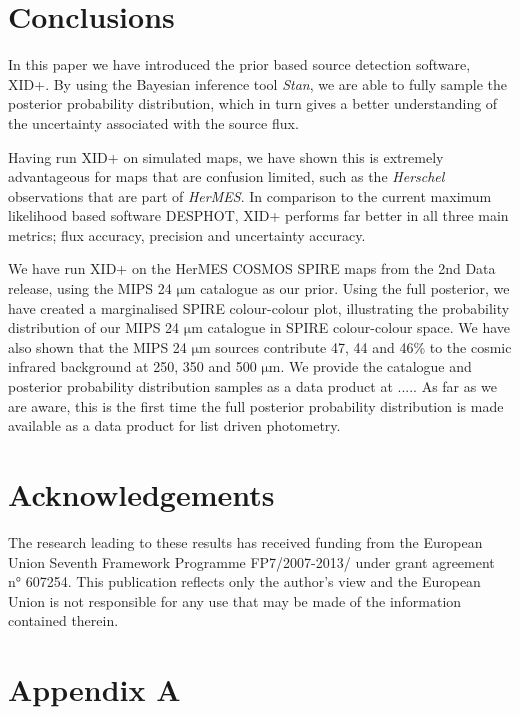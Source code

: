 \documentclass[useAMS,usenatbib]{mnras}
\begin{document}
\section{Conclusions}\label{sec:conc}
In this paper we have introduced the prior based source detection software, \textsc{XID+}. By using the Bayesian inference tool \emph{Stan}, we are able to fully sample the posterior probability distribution, which in turn gives a better understanding of the uncertainty associated with the source flux. 

Having run \textsc{XID+} on simulated maps, we have shown this is extremely advantageous for maps that are confusion limited, such as the \emph{Herschel} observations that are part of \emph{HerMES}. In comparison to the current maximum likelihood based software \textsc{DESPHOT}, XID+ performs far better in all three main metrics; flux accuracy, precision and uncertainty accuracy.

We have run \textsc{XID+} on the HerMES COSMOS SPIRE maps from the 2nd Data release, using the MIPS 24 $\mathrm{\mu m}$ catalogue \citep{LeFLoch:2009} as our prior. Using the full posterior, we have created a marginalised SPIRE colour-colour plot, illustrating the probability distribution of our MIPS 24 $\mathrm{\mu m}$ catalogue in SPIRE colour-colour space. We have also shown that the MIPS 24 $\mathrm{\mu m}$ sources contribute 47, 44 and 46\%  to the cosmic infrared background at 250, 350 and 500 $\mathrm{\mu m}$. We provide the catalogue and posterior probability distribution samples as a data product at ..... As far as we are aware, this is the first time the full posterior probability distribution is made available as a data product for list driven photometry.
 

\section*{Acknowledgements}%
The research leading to these results has received funding from the European Union Seventh Framework Programme FP7/2007-2013/ under grant agreement n° 607254. This publication reflects only the author’s view and the European Union is not responsible for any use that may be made of the information contained therein.
%
%

\appendix
\section*{Appendix A}\label{Stan_model}
\onecolumn

%
%
%
%
%
%
%
\end{document}
